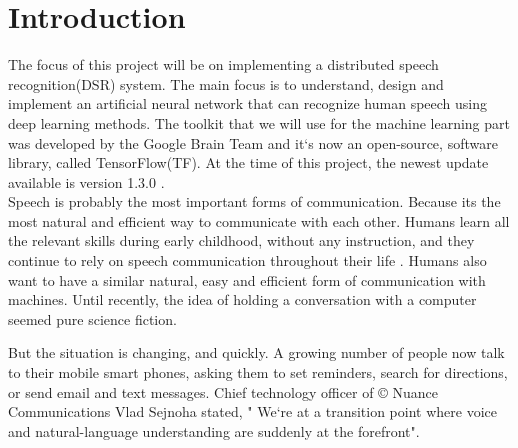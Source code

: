 \chapter{Introduction}\label{ch:introduction}

The focus of this project will be on implementing a distributed speech recognition(DSR) system.
The main focus is to understand, design and implement an artificial neural network that can recognize human speech using deep learning methods.
The toolkit that we will use for the machine learning part was developed by the Google Brain Team and it`s now an open-source, software library, called TensorFlow(TF).
At the time of this project, the newest update available is version 1.3.0 \cite{tensorflow2015-whitepaper}.\\

Speech is probably the most important forms of communication. Because its the most natural and efficient way to communicate with each other. Humans learn all the relevant skills during early childhood, without any instruction, and they continue to rely on speech communication throughout their life \cite{kamblespeech}. Humans also want to have a similar natural, easy and efficient form of communication with machines. Until recently, the idea of holding a conversation with a computer seemed pure science fiction.

But the situation is changing, and quickly. A growing number of people now talk to their mobile smart phones, asking them to set reminders, search for directions, or send email and text messages. Chief technology officer of \copyright{} Nuance Communications Vlad Sejnoha stated, 
" We`re at a transition point where voice and natural-language understanding are suddenly at the forefront".\cite{kamblespeech}
 






